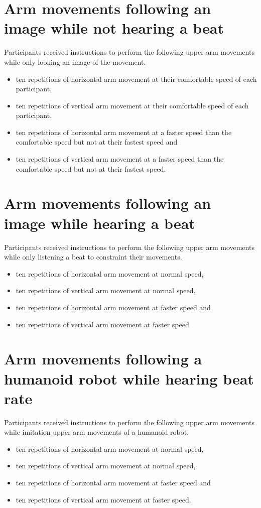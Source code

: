 \section{Arm movements following an image while not hearing a beat}
Participants received instructions to perform the following upper arm 
movements while only looking an image of the movement.
\begin{itemize}[noitemsep,topsep=0pt]
\item ten repetitions of horizontal arm movement at their comfortable speed of each participant,
\item ten repetitions of vertical arm movement at their comfortable speed of each participant,
\item ten repetitions of horizontal arm movement at a faster speed than the comfortable speed
	but not at their fastest speed and
\item ten repetitions of vertical arm movement at a faster speed than the comfortable speed
 	but not at their fastest speed.
\end{itemize}

\section{Arm movements following an image while hearing a beat}
Participants received instructions to perform the following upper arm 
movements while only listening a beat to constraint their movements. 
\begin{itemize}[noitemsep,topsep=0pt]
\item ten repetitions of horizontal arm movement at normal speed,
\item ten repetitions of vertical arm movement at normal speed,
\item ten repetitions of horizontal arm movement at faster speed and
\item ten repetitions of vertical arm movement at faster speed
\end{itemize}


\section{Arm movements following a humanoid robot while hearing beat rate}
Participants received instructions to perform the following upper arm 
movements while imitation upper arm movements of a humanoid robot.
\begin{itemize}[noitemsep,topsep=0pt]
\item ten repetitions of horizontal arm movement at normal speed, 
\item ten repetitions of vertical arm movement at normal speed, 
\item ten repetitions of horizontal arm movement at faster speed and
\item ten repetitions of vertical arm movement at faster speed.
\end{itemize}



